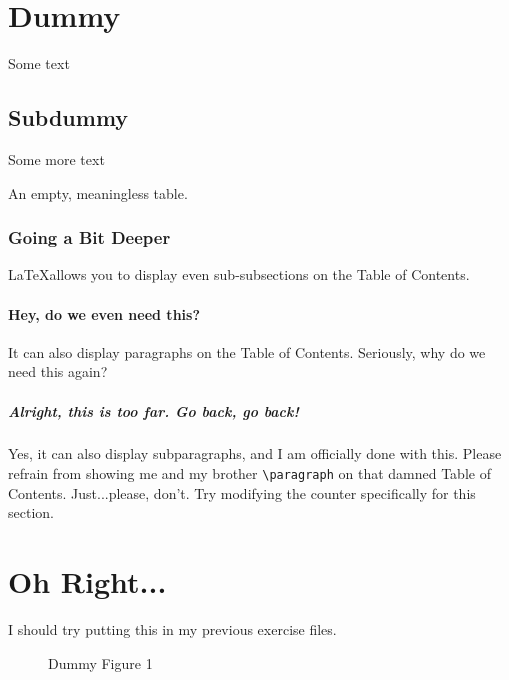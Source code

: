 \documentclass{article}
\begin{document}
	
	\doublespacing			
	\tableofcontents
	\singlespacing			%
	
	\newpage
	
	\section{Dummy}
	Some text
	\subsection{Subdummy}
	Some more text
	\begin{table}[h]
		\caption{An empty, meaningless table.}
	\end{table}
	\subsubsection{Going a Bit Deeper}
		\LaTeX allows you to display even sub-subsections on the Table of Contents.
	\paragraph{Hey, do we even need this?}
		It can also display paragraphs on the Table of Contents. Seriously, why do we need this again?
	\subparagraph{Alright, this is too far. Go back, go back!}
		Yes, it can also display subparagraphs, and I am officially done with this. Please refrain from showing me and my brother {\tt \textbackslash paragraph} on that damned Table of Contents. Just...please, don't. Try modifying the counter specifically for this section.

	\section{Oh Right...}
	I should try putting this in my previous exercise files.
	\begin{figure}[h]
		\caption{Dummy Figure 1}
	\end{figure}		
	

	\newpage
	\begin{appendix}
		\listoffigures
		\listoftables
	\end{appendix}
\end{document}
